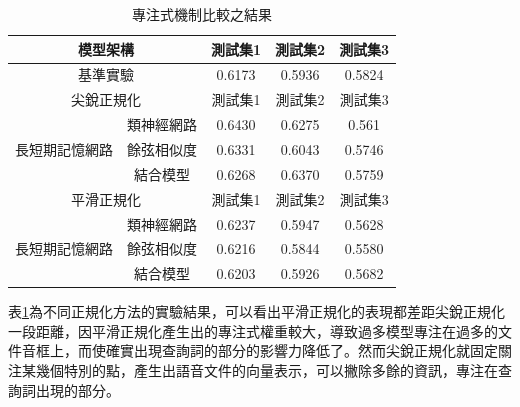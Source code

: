 \begin{table}[ht]
	 \centering
	 \caption{專注式機制比較之結果}
	 \label{table:ch4_att}
	 \begin{tabular}{|c|c|c|c|c|}
		 \hline
		 \multicolumn{2}{|c|}{模型架構} & 測試集1 & 測試集2 & 測試集3 \\
		 \hline
		 \multicolumn{2}{|c|}{基準實驗} & 0.6173 & 0.5936 & 0.5824\\
		 \hline
		 \hline 
		 \multicolumn{2}{|c|}{尖銳正規化} & 測試集1 &測試集2 & 測試集3 \\
		 \hline
		 \multirow{3}{*}{長短期記憶網路} & 類神經網路 &
		 {\color{red}0.6430} &0.6275 & 0.561 \\
		 \cline{2-5}
		 & 餘弦相似度& 0.6331 & 0.6043 & 0.5746 \\
		 \cline{2-5}
		 & 結合模型 & 0.6268 & 0.6370 & 0.5759 \\ 
		 \hline
		 \hline
		 \multicolumn{2}{|c|}{平滑正規化} & 測試集1 &測試集2
		 &測試集3 \\
		 \hline
		 \multirow{3}{*}{長短期記憶網路} & 類神經網路 &
		 0.6237 & 0.5947 & 0.5628\\
		 \cline{2-5}
		 & 餘弦相似度& 0.6216 &0.5844 & 0.5580 \\
		 \cline{2-5}
		 & 結合模型 &0.6203&0.5926&0.5682 \\
		 \hline
	   \end{tabular}
\end{table}
表\ref{table:ch4_att}為不同正規化方法的實驗結果，可以看出平滑正規化的表現都差距尖銳正規化一段距離，因平滑正規化產生出的專注式權重較大，導致過多模型專注在過多的文件音框上，而使確實出現查詢詞的部分的影響力降低了。然而尖銳正規化就固定關注某幾個特別的點，產生出語音文件的向量表示，可以撇除多餘的資訊，專注在查詢詞出現的部分。

